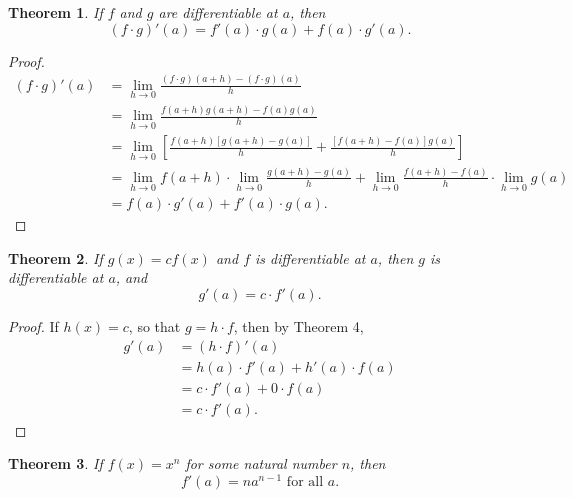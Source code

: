 \documentclass{article}
\newtheorem{theorem}{Theorem}
\begin{document}
\begin{theorem}
  If $f$ and $g$ are differentiable at $a$, then \begin{equation*}
    (f \cdot g)'(a) = f'(a) \cdot g(a) + f(a) \cdot g'(a).
  \end{equation*}
\end{theorem}

\begin{proof}
  \begin{align*}
    (f \cdot g)'(a) &= \lim_{h \rightarrow 0}\frac{(f \cdot g)(a + h) - (f
      \cdot g)(a)}{h} \\
      &= \lim_{h \rightarrow 0}\frac{f(a + h)g(a + h) - f(a)g(a)}{h} \\
      &= \lim_{h \rightarrow 0}{\left[\frac{f(a + h)[g(a + h) - g(a)]}{h} +
        \frac{[f(a + h) - f(a)]g(a)}{h}\right]} \\
      &= \lim_{h \rightarrow 0}f(a + h) \cdot \lim_{h \rightarrow 0}\frac{g(a +
        h) - g(a)}{h} + \lim_{h \rightarrow 0}\frac{f(a + h) - f(a)}{h} \cdot
        \lim_{h \rightarrow 0}g(a) \\
      &= f(a) \cdot g'(a) + f'(a) \cdot g(a).
  \end{align*}
\end{proof}

\begin{theorem}
  If $g(x) = cf(x)$ and $f$ is differentiable at $a$, then $g$ is
  differentiable at $a$, and \begin{equation*}
    g'(a) = c \cdot f'(a).
  \end{equation*}
\end{theorem}

\begin{proof}
  If $h(x) = c$, so that $g = h \cdot f$, then by Theorem 4, \begin{align*}
    g'(a) &= (h \cdot f)'(a) \\
      &= h(a) \cdot f'(a) + h'(a) \cdot f(a) \\
      &= c \cdot f'(a) + 0 \cdot f(a) \\
      &= c \cdot f'(a).
  \end{align*}
\end{proof}

\begin{theorem}
  If $f(x) = x^n$ for some natural number $n$, then \begin{equation*}
    f'(a) = na^{n-1} \text{ for all } a.
  \end{equation*}
\end{theorem}
\end{document}
